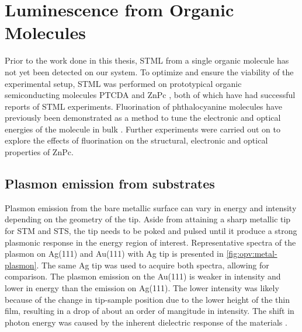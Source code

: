 
\chapter{Luminescence from Organic Molecules}
\label{ch:opv}

Prior to the work done in this thesis, \ac{STML} from a single organic molecule has not yet been detected on our system. To optimize and ensure the viability of the experimental setup, \ac{STML} was performed on prototypical organic semiconducting molecules \ac{PTCDA} \citep{Rzeznicka2011, Kimura2019} and \ac{ZnPc} \citep{Zhang2016, Doppagne2017, Zhang2017, Imada2016, Doppagne2018, Miwa2019}, both of which have had successful reports of \ac{STML} experiments. Fluorination of phthalocyanine molecules have previously been demonstrated as a method to tune the electronic and optical energies of the molecule in bulk \citep{schwarze2016band, warren2019controlling}. Further experiments were carried out on  to explore the effects of fluorination on the structural, electronic and optical properties of ZnPc.


\section{Plasmon emission from substrates}

Plasmon emission from the bare metallic surface can vary in energy and intensity depending on the geometry of the tip. Aside from attaining a sharp metallic tip for \ac{STM} and \ac{STS}, the tip needs to be poked and pulsed until it produce a strong plasmonic response in the energy region of interest. Representative spectra of the plasmon on Ag(111) and Au(111) with Ag tip is presented in \autoref{fig:opv:metal-plasmon}. The same Ag tip was used to acquire both spectra, allowing for comparison. The plasmon emission on the Au(111) is weaker in intensity and lower in energy than the emission on Ag(111). The lower intensity was likely because of the change in tip-sample position due to the lower height of the thin film, resulting in a drop of about an order of mangitude in intensity. The shift in photon energy was caused by the inherent dielectric response of the materials \citep{olmon2012optical, yang2015optical}.


